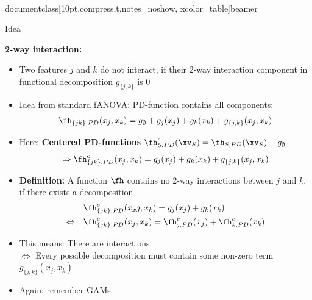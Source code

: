 \\documentclass[10pt,compress,t,notes=noshow, xcolor=table]{beamer}
\begin{document}
\begin{frame}{Idea %
}

    \textbf{2-way interaction:}
    \begin{itemize}[<+->]
        \item Two features $j$ and $k$ do not interact, if their 2-way interaction component in functional decomposition $g_{\{j,k\}}$ is 0
        \item Idea from standard fANOVA: PD-function contains all components:
        $$
        \fh_{\{jk\}, PD}(x_j, x_k)
        = g_\emptyset + g_j(x_j) + g_k(x_k) + g_{\{j,k\}}(x_j, x_k)
        $$
        \item Here: \textbf{Centered PD-functions} $\fh_{S,PD}^c(\xv_S) = \fh_{S,PD}(\xv_S) - g_\emptyset$
        $$
        \Rightarrow \fh^c_{\{jk\}, PD}(x_j, x_k)
        = g_j(x_j) + g_k(x_k) + g_{\{j,k\}}(x_j, x_k)
        $$
        \item \textbf{Definition:} A function $\fh$ contains no 2-way interactions between $j$ and $k$, if there exists a decomposition
        \begin{align*}
            & \fh_{\{jk\}, PD}^c(x_xj, x_k)
            = g_j(x_j) + g_k(x_k) \\
            \Leftrightarrow \quad
            & \fh_{\{jk\}, PD}^c(x_j, x_k)
            = \fh^c_{j, PD}(x_j) + \fh^c_{k, PD}(x_k)
        \end{align*}
        \item This means: There are interactions \\
        $\Leftrightarrow$ Every possible decomposition must contain some non-zero term $g_{\{j,k\}}(x_j, x_k)$
        \item Again: remember GAMs
    \end{itemize}
    


\end{frame}
\end{document}
